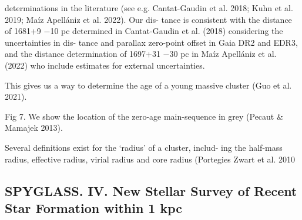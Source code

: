 \documentclass[../main.tex]{subfiles}
\begin{document}
{determinations in the literature (see e.g. Cantat-Gaudin et al.
2018; Kuhn et al. 2019; Maíz Apellániz et al. 2022). Our dis-
tance is consistent with the distance of 1681+9
−10 pc determined in
Cantat-Gaudin et al. (2018) considering the uncertainties in dis-
tance and parallax zero-point oﬀset in Gaia DR2 and EDR3, and
the distance determination of 1697+31
−30 pc in Maíz Apellániz et al.
(2022) who include estimates for external uncertainties.

This gives us a way to determine the age of a young massive
cluster (Guo et al. 2021).


Fig 7. We show the location of the zero-age main-sequence in grey (Pecaut & Mamajek 2013).

Several definitions exist for the ‘radius’ of a cluster, includ-
ing the half-mass radius, eﬀective radius, virial radius and core
radius (Portegies Zwart et al. 2010
\subsection{SPYGLASS. IV. New Stellar Survey of Recent Star Formation within 1 kpc}

}
\end{document}
